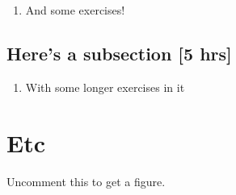 \documentclass{tufte-handout}
\newcommand{\x}{\mathbf{x}}
\begin{document}
\begin{enumerate}[resume]
\item And some exercises!
\end{enumerate}


\subsection{Here's a subsection [5 hrs]}

\begin{enumerate}[resume]
\item  With some longer exercises in it
\end{enumerate}

\section{Etc}

Uncomment this to get a figure.


\end{document}
